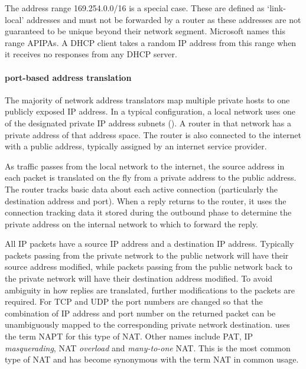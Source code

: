 The address range 169.254.0.0/16 is a special case.
These are defined as `link-local' addresses and must not be forwarded by a router as these addresses are not guaranteed to be unique beyond their network segment.%
Microsoft names this range \acp{APIPA}.%
A \acs{DHCP} client takes a random \acs{IP} address from this range when it receives no responses from any \acs{DHCP} server.

\paragraph{port-based address translation}
The majority of network address translators map multiple private hosts to one publicly exposed \acs{IP} address.
In a typical configuration, a local network uses one of the designated private \acs{IP} address subnets ().
A router in that network has a private address of that address space.
The router is also connected to the internet with a public address, typically assigned by an internet service provider.

As traffic passes from the local network to the internet, the source address in each packet is translated on the fly from a private address to the public address.
The router tracks basic data about each active connection (particularly the destination address and port).
When a reply returns to the router, it uses the connection tracking data it stored during the outbound phase to determine the private address on the internal network to which to forward the reply.

All \acs{IP} packets have a source \acs{IP} address and a destination \acs{IP} address.
Typically packets passing from the private network to the public network will have their source address modified, while packets passing from the public network back to the private network will have their destination address modified.
To avoid ambiguity in how replies are translated, further modifications to the packets are required.
For \acs{TCP} and \acs{UDP} the port numbers are changed so that the combination of \acs{IP} address and port number on the returned packet can be unambiguously mapped to the corresponding private network destination.
 uses the term \gls{NAPT} for this type of \acs{NAT}.
Other names include \gls{PAT}, \acs{IP} \emph{masquerading}, \acs{NAT} \emph{overload} and \emph{many-to-one} \acs{NAT}.
This is the most common type of \acs{NAT} and has become synonymous with the term \acs{NAT} in common usage.

